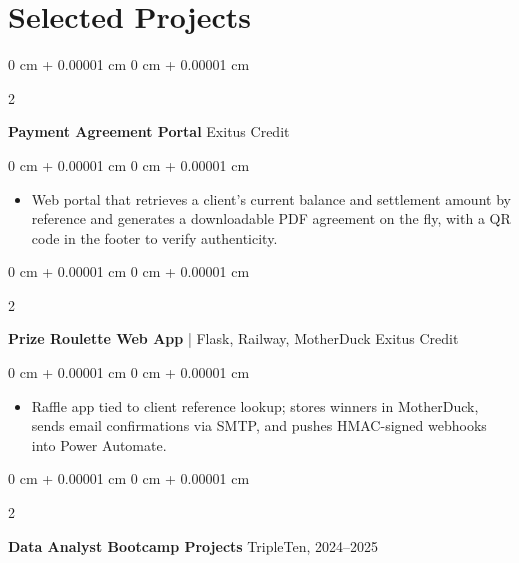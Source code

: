 \documentclass[10pt, a4paper]{article}
\newenvironment{highlights}{
    \begin{itemize}[
        topsep=0.10 cm,
        parsep=0.10 cm,
        partopsep=0pt,
        itemsep=0pt,
        leftmargin=0 cm + 10pt
    ]
}{
    \end{itemize}
} %
\newenvironment{onecolentry}{
    \begin{adjustwidth}{
        0 cm + 0.00001 cm
    }{
        0 cm + 0.00001 cm
    }
}{
    \end{adjustwidth}
} %
\newenvironment{twocolentry}[2][]{
    \onecolentry
    \def\secondColumn{#2}
    \setcolumnwidth{\fill, 4.5 cm}
    \begin{paracol}{2}
}{
    \switchcolumn \raggedleft \secondColumn
    \end{paracol}
    \endonecolentry
} %
\begin{document}
    \section{Selected Projects}

    \begin{twocolentry}{
            Exitus Credit
        }
        \textbf{Payment Agreement Portal}\end{twocolentry}

        \vspace{0.10 cm}
        \begin{onecolentry}
            \begin{highlights}
                \item Web portal that retrieves a client's current balance and settlement amount by reference and generates a downloadable PDF agreement on the fly, with a QR code in the footer to verify authenticity.
            \end{highlights}
        \end{onecolentry}

        \vspace{0.2 cm}

    \begin{twocolentry}{
            Exitus Credit
        }
        \textbf{Prize Roulette Web App} | Flask, Railway, MotherDuck\end{twocolentry}

        \vspace{0.10 cm}
        \begin{onecolentry}
            \begin{highlights}
                \item Raffle app tied to client reference lookup; stores winners in MotherDuck, sends email confirmations via SMTP, and pushes HMAC-signed webhooks into Power Automate.
            \end{highlights}
        \end{onecolentry}

        \vspace{0.2 cm}

    \begin{twocolentry}{
            TripleTen, 2024--2025
        }
        \textbf{Data Analyst Bootcamp Projects}\end{twocolentry}
\end{document}
